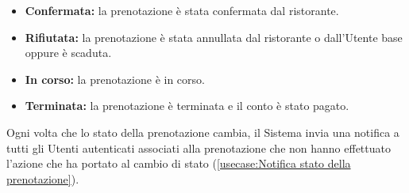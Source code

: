 \begin{itemize}
\begin{itemize}
\begin{itemize}
			            \item \textbf{Confermata:} la prenotazione è
			                  stata confermata dal ristorante.

			            \item \textbf{Rifiutata:} la prenotazione è
			                  stata annullata dal ristorante o dall'Utente base
			                  oppure è scaduta.

			            \item \textbf{In corso:} la prenotazione è
			                  in corso.

			            \item \textbf{Terminata:} la prenotazione è
			                  terminata e il conto è stato pagato.
		            \end{itemize}

		            Ogni volta che lo stato della prenotazione cambia, il Sistema
		            invia una notifica a tutti gli Utenti autenticati associati alla
		            prenotazione che non hanno effettuato l'azione che ha portato al
		            cambio di stato (\autoref{usecase:Notifica stato della prenotazione}).
	      \end{itemize}

\end{itemize}
